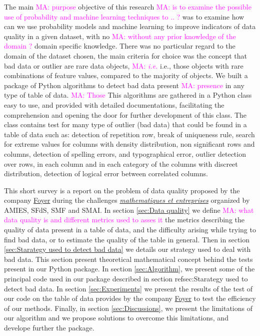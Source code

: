 \documentclass{article}
\newcommand\mabaach[1]{\textcolor{magenta}{MA: #1}}
\begin{document}
The main \mabaach{purpose} objective of this research \mabaach{is to examine the possible use of probability and machine learning techniques to .. ?} was to examine how can we use
probability models and machine learning to improve indicators
of data quality in a given dataset, with no \mabaach{without any prior knowledge of the domain ?} domain specific knowledge.
There was no particular regard to the domain of the dataset chosen, the main criteria for choice was the concept that bad data or outlier are rare data objects, \mabaach{\textit{i.e.}} i.e., those objects with rare combinations of feature values, compared to the majority of objects.
We built a package of Python algorithms to detect bad data present \mabaach{presence} in any type of table of data. \mabaach{Those} This algorithms are gathered in a Python class easy to use, and provided with detailed documentations, facilitating the comprehension and opening the door for further development of this class. The class contains test for many type of outlier (bad data) that could be found in a table of data such as: detection of repetition row, break of uniqueness rule, search for extreme values for columns with density distribution, non significant rows and columns, detection of spelling errors, and typographical error, outlier detection over rows, in each column and in each category of the columns with discreet distribution, detection of logical error between correlated columns.

This short survey is a report on the problem of data quality proposed by the company \href{ https://www.foyer.lu/en/homepage}{Foyer} during the challenges \href{https://challenge-maths.sciencesconf.org/}{\textit{mathematiques et entreprises}} organized by AMIES,  SFdS, SMF and SMAI.
In section \ref{sec:Data quality} we define \mabaach{what data quality is and different metrics used to asses it} the metrics describing the quality of data present in a table of data, and the difficulty arising while trying to find bad data, or to estimate the quality of the table in general. Then in section \ref{sec:Starategy used to detect bad data} we details our strategy used to deal with bad data. This section present theoretical mathematical concept behind the tests present in our Python package. In section \ref{sec:Algorithm}, we present some of the principal code used in our package described in section ref{sec:Starategy used to detect bad data}. In section \ref{sec:Experiments} we present the results of the test of our code on the table of data provides by the company \href{ https://www.foyer.lu/en/homepage}{Foyer} to test the efficiency of our methods. Finally, in section \ref{sec:Discussions}, we present the limitations of our algorithm and we propose solutions to overcome this limitations, and develope further the package.
\end{document}
